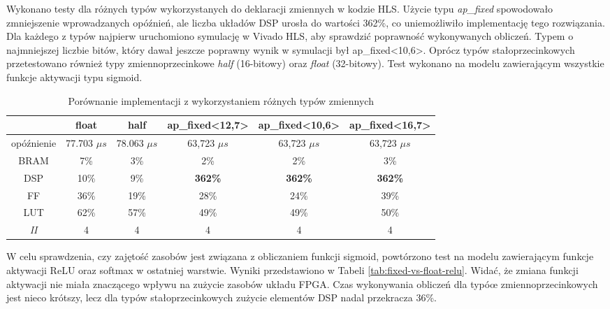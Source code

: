 Wykonano testy dla różnych typów wykorzystanych do deklaracji zmiennych w kodzie HLS. Użycie typu \emph{ap\_fixed} spowodowało zmniejszenie wprowadzanych opóźnień, ale liczba układów DSP urosła do wartości 362\%, co uniemożliwiło implementację tego rozwiązania. Dla każdego z typów najpierw uruchomiono symulację w Vivado HLS, aby sprawdzić poprawność wykonywanych obliczeń.
Typem o najmniejszej liczbie bitów, który dawał jeszcze poprawny wynik w symulacji był ap\_fixed<10,6>. Oprócz typów stałoprzecinkowych przetestowano również typy zmiennoprzecinkowe \emph{half} (16-bitowy) oraz \emph{float} (32-bitowy). Test wykonano na modelu zawierającym wszystkie funkcje aktywacji typu sigmoid.

\begin{table}[h] \centering
  \caption{Porównanie implementacji z wykorzystaniem różnych typów zmiennych}
  \centering
  \begin{tabular} {c|c|c|c|c|c} \hline \label{tab:fixed-vs-float}  
                  & float           & half            & ap\_fixed<12,7> & ap\_fixed<10,6> & ap\_fixed<16,7> \\ \hline
    opóźnienie    & 77.703 $\mu s$  & 78.063 $\mu s$  & 63,723 $\mu s$  & 63,723 $\mu s$  & 63,723 $\mu s$  \\
    BRAM          & 7\%             & 3\%             & 2\%             & 2\%             & 3\%             \\
    DSP           & 10\%            & 9\%             & \textbf{362\%}  & \textbf{362\%}  & \textbf{362\%}  \\
    FF            & 36\%            & 19\%            & 28\%            & 24\%            & 39\%            \\
    LUT           & 62\%            & 57\%            & 49\%            & 49\%            & 50\%            \\
    \emph{II}     & 4               & 4               & 4               & 4               &  4              \\
  \end{tabular}
\end{table}

W celu sprawdzenia, czy zajętość zasobów jest związana z obliczaniem funkcji sigmoid, powtórzono test na modelu zawierającym funkcje aktywacji ReLU oraz softmax w ostatniej warstwie. Wyniki przedstawiono w Tabeli \ref{tab:fixed-vs-float-relu}. Widać, że zmiana funkcji aktywacji nie miała znaczącego wpływu na zużycie zasobów układu FPGA. Czas wykonywania obliczeń dla typóœ zmiennoprzecinkowych jest nieco krótszy, lecz dla typów stałoprzecinkowych zużycie elementów DSP nadal przekracza 36\%.

